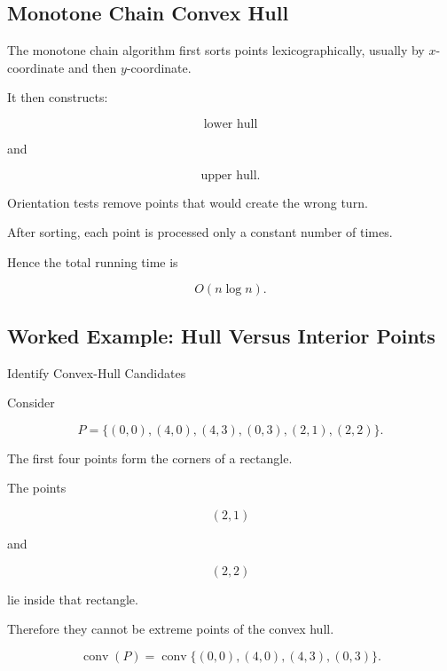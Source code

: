 \subsection{Monotone Chain Convex Hull}
\label{subsec:monotone-chain-hull}

The monotone chain algorithm first sorts points lexicographically, usually
by \(x\)-coordinate and then \(y\)-coordinate.

It then constructs:

\[
\boxed{
\text{lower hull}
}
\]

and

\[
\boxed{
\text{upper hull}.
}
\]

Orientation tests remove points that would create the wrong turn.

After sorting, each point is processed only a constant number of times.

Hence the total running time is

\[
\boxed{
O(n\log n).
}
\]

\subsection{Worked Example: Hull Versus Interior Points}
\label{subsec:hull-interior-example}

\begin{workedexamplebox}{Identify Convex-Hull Candidates}

Consider

\[
P=
\{
(0,0),
(4,0),
(4,3),
(0,3),
(2,1),
(2,2)
\}.
\]

The first four points form the corners of a rectangle.

The points

\[
(2,1)
\]

and

\[
(2,2)
\]

lie inside that rectangle.

Therefore they cannot be extreme points of the convex hull.

\begin{answerbox}
\[
\boxed{
\operatorname{conv}(P)
=
\operatorname{conv}
\{(0,0),(4,0),(4,3),(0,3)\}.
}
\]
\end{answerbox}
\end{workedexamplebox}

